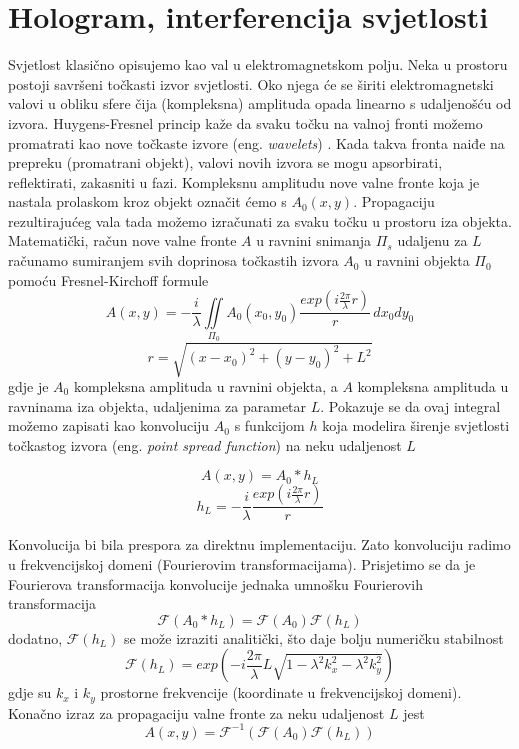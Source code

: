 \documentclass[hidelinks]{ferseminar}
\begin{document}
\section{Hologram, interferencija svjetlosti}
\label{interf}
Svjetlost klasično opisujemo kao val u elektromagnetskom polju. Neka u prostoru postoji savršeni točkasti izvor svjetlosti. Oko njega će se širiti elektromagnetski valovi u obliku sfere čija (kompleksna) amplituda opada linearno s udaljenošću od izvora. Huygens-Fresnel princip kaže da svaku točku na valnoj fronti možemo promatrati kao nove točkaste izvore (eng. \emph{wavelets}) \cite{goodman2005introduction}. Kada takva fronta naiđe na prepreku (promatrani objekt), valovi novih izvora se mogu apsorbirati, reflektirati, zakasniti u fazi. Kompleksnu amplitudu nove valne fronte koja je nastala prolaskom kroz objekt označit ćemo s $A_0(x,y)$. Propagaciju rezultirajućeg vala tada možemo izračunati za svaku točku u prostoru iza objekta. Matematički, račun nove valne fronte $A$ u ravnini snimanja $\Pi_s$ udaljenu za $L$ računamo sumiranjem svih doprinosa točkastih izvora $A_0$ u ravnini objekta $\Pi_0$ pomoću Fresnel-Kirchoff formule
\begin{equation}
A(x,y)=-\frac{i}{\lambda}\iint\limits_{\Pi_0}A_0(x_0,y_0)\frac{exp(i\frac{2\pi}{\lambda}r)}{r}\,dx_0dy_0
\end{equation}
\begin{equation}
r = \sqrt{(x-x_0)^2+(y-y_0)^2+L^2}
\end{equation}
gdje je $A_0$ kompleksna amplituda u ravnini objekta, a $A$ kompleksna amplituda u ravninama iza objekta, udaljenima za parametar $L$. Pokazuje se da ovaj integral možemo zapisati kao konvoluciju $A_0$ s funkcijom $h$ koja modelira širenje svjetlosti točkastog izvora (eng. \textit{point spread function}) na neku udaljenost $L$

\begin{equation}
A(x,y)=A_0\ast h_L
\end{equation}
\begin{equation}
h_L=-\frac{i}{\lambda}\frac{exp(i\frac{2\pi}{\lambda}r)}{r}
\end{equation}

Konvolucija bi bila prespora za direktnu implementaciju. Zato konvoluciju radimo u frekvencijskoj domeni (Fourierovim transformacijama). Prisjetimo se da je Fourierova transformacija konvolucije jednaka umnošku Fourierovih transformacija
\begin{equation}
\mathcal{F}(A_0\ast h_L)=\mathcal{F}(A_0)\mathcal{F}(h_L)
\end{equation}
dodatno, $\mathcal{F}(h_L)$ se može izraziti analitički, što daje bolju numeričku stabilnost
\begin{equation}
\label{propagator}
\mathcal{F}(h_L)=exp(-i\frac{2\pi}{\lambda}L\sqrt{1-\lambda^2k_x^2-\lambda^2k_y^2})
\end{equation}
gdje su $k_x$ i $k_y$ prostorne frekvencije (koordinate u frekvencijskoj domeni). Konačno izraz za propagaciju valne fronte za neku udaljenost $L$ jest
\begin{equation}
\label{angspecmeth}
A(x,y)=\mathcal{F}^{-1}(\mathcal{F}(A_0)\mathcal{F}(h_L))
\end{equation}
\end{document}
